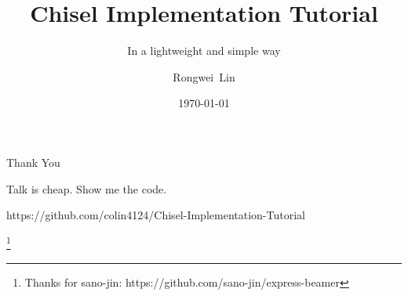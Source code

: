\documentclass[xetex, unicode, 10pt]{beamer}
\title{
  Chisel Implementation Tutorial
}
\subtitle{In a lightweight and simple way}
\author{Rongwei\ Lin}
\institute{
  JLSemi Inc.
}
\date{\today}
\newcommand\blfootnote[1]{%
  \begingroup
  \renewcommand\thefootnote{}\footnote{#1}%
  \addtocounter{footnote}{-1}%
  \endgroup
}
\begin{document}
\maketitle







\begin{frame}{Thank You}
  \printbibheading[heading = none]
  \printbibliography
  \begin{block}{Talk is cheap. Show me the code.}
    \begin{itemize}
     \thusitem https://github.com/colin4124/Chisel-Implementation-Tutorial
    \end{itemize}
  \end{block}
  \blfootnote{
  Thanks for sano-jin: https://github.com/sano-jin/express-beamer
  }

\end{frame}
\end{document}
